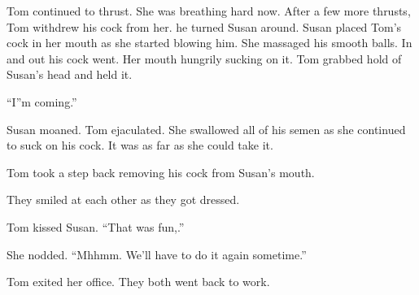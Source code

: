 Tom continued to thrust. She was breathing hard now. After a few more thrusts, Tom withdrew his cock from her. he turned Susan around. Susan placed Tom’s cock in her mouth as she started blowing him. She massaged his smooth balls. In and out his cock went. Her mouth hungrily sucking on it. Tom grabbed hold of Susan’s head and held it.

“I”m coming.”

Susan moaned. Tom ejaculated. She swallowed all of his semen as she continued to suck on his cock. It was as far as she could take it.

Tom took a step back removing his cock from Susan’s mouth.

They smiled at each other as they got dressed.

Tom kissed Susan. “That was fun,.”

She nodded. “Mhhmm. We’ll have to do it again sometime.”

Tom exited her office. They both went back to work.
